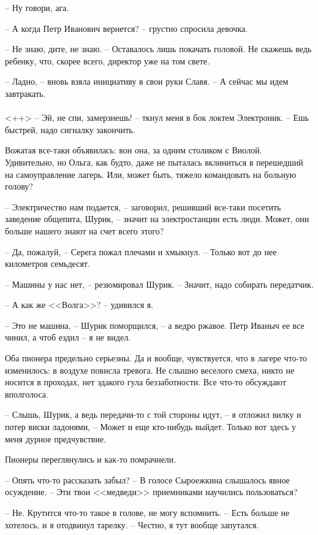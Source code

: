 \documentclass[a4paper]{book}
\begin{document}
-- Ну говори, ага.

-- А когда Петр Иванович вернется? -- грустно спросила девочка.

-- Не знаю, дите, не знаю. -- Оставалось лишь покачать головой. Не скажешь ведь ребенку, что, скорее всего, директор уже на том свете.

-- Ладно, -- вновь взяла инициативу в свои руки Славя. -- А сейчас мы идем завтракать. 

\paragraph{}<++>
-- Эй, не спи, замерзнешь! -- ткнул меня в бок локтем Электроник. -- Ешь быстрей, надо сигналку закончить. 

Вожатая все-таки объявилась: вон она, за одним столиком с Виолой. Удивительно, но Ольга, как будто, даже не пыталась вклиниться в перешедший на самоуправление лагерь. Или, может быть, тяжело командовать на больную голову?

-- Электричество нам подается, -- заговорил, решивший все-таки посетить заведение общепита, Шурик, -- значит на электростанции есть люди. Может, они больше нашего знают на счет всего этого?

-- Да, пожалуй, -- Серега пожал плечами и хмыкнул. -- Только вот до нее километров семьдесят.

-- Машины у нас нет, -- резюмировал Шурик. -- Значит, надо собирать передатчик. 

-- А как же <<Волга>>? -- удивился я.

-- Это не машина, -- Шурик поморщился, -- а ведро ржавое. Петр Иваныч ее все чинил, а чтоб ездил -- я не видел.

Оба пионера предельно серьезны. Да и вообще, чувствуется, что в лагере что-то изменилось: в воздухе повисла тревога. Не слышно веселого смеха, никто не носится в проходах, нет эдакого гула беззаботности. Все что-то обсуждают вполголоса. 

-- Слышь, Шурик, а ведь передачи-то с той стороны идут, -- я отложил вилку и потер виски ладонями, -- Может и еще кто-нибудь выйдет. Только вот здесь у меня дурное предчувствие.

Пионеры переглянулись и как-то помрачнели. 

-- Опять что-то рассказать забыл? -- В голосе Сыроежкина слышалось явное осуждение. -- Эти твои <<медведи>> приемниками научились пользоваться?

-- Не. Крутится что-то такое в голове, не могу вспомнить. -- Есть больше не хотелось, и я отодвинул тарелку. -- Честно, я тут вообще запутался.
\end{document}

